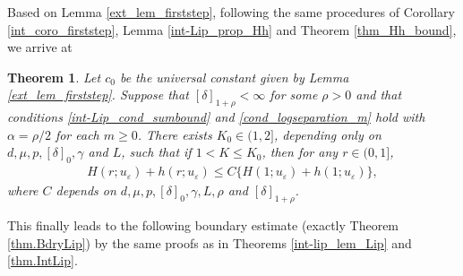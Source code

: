 \documentclass[reqno,12pt]{amsart} %
\newtheorem{theorem}{Theorem}[section]
\newtheorem{proposition}[theorem]{Proposition}
\theoremstyle{definition}
\theoremstyle{remark}
\numberwithin{equation}{section}
\begin{document}
Based on Lemma \ref{ext_lem_firststep}, following the same procedures of Corollary \ref{int_coro_firststep}, Lemma \ref{int-Lip_prop_Hh} and Theorem \ref{thm_Hh_bound}, we arrive at

\begin{theorem}\label{ext_lem_Hh_bound}
     Let $c_0$ be the universal constant given by Lemma \ref{ext_lem_firststep}. Suppose that $[\delta]_{1+\rho}<\infty$ for some $\rho>0$ and that conditions \eqref{int-Lip_cond_sumbound} and \eqref{cond_logseparation_m} hold with $\alpha=\rho/2$ for each $m\geq 0$. There exists $K_0\in(1, 2]$, depending only on $d, \mu, p, [\delta]_0, \gamma $ and $L$, such that if $1<K\leq K_0$, then for any $r\in(0, 1]$,
  \begin{align*}
    H(r; u_\varepsilon)+h(r; u_\varepsilon)\leq C\{H(1; u_\varepsilon)+h(1; u_\varepsilon)\},
  \end{align*}
  where $C$ depends on $d, \mu, p, [\delta]_0, \gamma, L, \rho$ and $[\delta]_{1+\rho}$.
\end{theorem}
This finally leads to the following boundary estimate (exactly Theorem \ref{thm.BdryLip}) by the same proofs as in Theorems \ref{int-lip_lem_Lip} and  \ref{thm.IntLip}.
\end{document}
